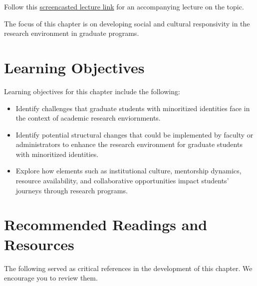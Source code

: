 \documentclass[
  11pt,
]{book}
\providecommand{\tightlist}{%
  \setlength{\itemsep}{0pt}\setlength{\parskip}{0pt}}
\begin{document}
Follow this \href{https://youtu.be/rS_Y-RMS2c8}{screencasted lecture link} for an accompanying lecture on the topic.

The focus of this chapter is on developing social and cultural responsivity in the research environment in graduate programs.

\section{Learning Objectives}\label{learning-objectives-5}

Learning objectives for this chapter include the following:

\begin{itemize}
\tightlist
\item
  Identify challenges that graduate students with minoritized identities face in the context of academic research enviornments.
\item
  Identify potential structural changes that could be implemented by faculty or administrators to enhance the research environment for graduate students with minoritized identities.
\item
  Explore how elements such as institutional culture, mentorship dynamics, resource availability, and collaborative opportunities impact students' journeys through research programs.
\end{itemize}

\section{Recommended Readings and Resources}\label{recommended-readings-and-resources-3}

The following served as critical references in the development of this chapter. We encourage you to review them.
\end{document}

